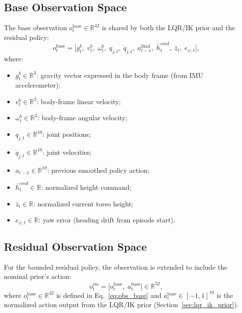 \documentclass[conference]{IEEEtran}
\begin{document}
\subsection{Base Observation Space}
The base observation $o_t^{\mathrm{base}} \in \mathbb{R}^{42}$ is shared by both
the LQR/IK prior and the residual policy:
\begin{equation}
o_t^{\mathrm{base}} = \big[
  g_t^b,\;
  v_t^b,\;
  \omega_t^b,\;
  q_{j,t},\;
  \dot{q}_{j,t},\;
  a_{t-1}^{\mathrm{final}},\;
  \bar{h}_t^{cmd},\;
  \bar{z}_t,\;
  e_{\psi,t}
\big],
\label{eq:obs_base}
\end{equation}
where:
\begin{itemize}
    \item $g_t^b \in \mathbb{R}^3$: gravity vector expressed in the
    body frame (from IMU accelerometer);
    \item $v_t^b \in \mathbb{R}^3$: body-frame linear velocity;
    \item $\omega_t^b \in \mathbb{R}^3$: body-frame angular velocity;
    \item $q_{j,t} \in \mathbb{R}^{10}$: joint positions;
    \item $\dot{q}_{j,t} \in \mathbb{R}^{10}$: joint velocities;
    \item $a_{t-1} \in \mathbb{R}^{10}$: previous smoothed policy action;
    \item $\bar{h}_t^{cmd} \in \mathbb{R}$: normalized height command;
    \item $\bar{z}_t \in \mathbb{R}$: normalized current torso height;
    \item $e_{\psi,t} \in \mathbb{R}$: yaw error (heading drift from
    episode start).
\end{itemize}

\subsection{Residual Observation Space}
\label{sec:residual_obs}

For the bounded residual policy, the observation is extended to include
the nominal prior's action:
\begin{equation}
o_t^{\mathrm{res}} = \big[
  o_t^{\mathrm{base}},\;
  a_t^{\mathrm{base}}
\big] \in \mathbb{R}^{52},
\label{eq:obs_residual}
\end{equation}
where $o_t^{\mathrm{base}} \in \mathbb{R}^{42}$ is defined in
Eq.~\eqref{eq:obs_base} and $a_t^{\mathrm{base}} \in [-1,1]^{10}$
is the normalized action output from the LQR/IK prior (Section~\ref{sec:lqr_ik_prior}).
\end{document}
